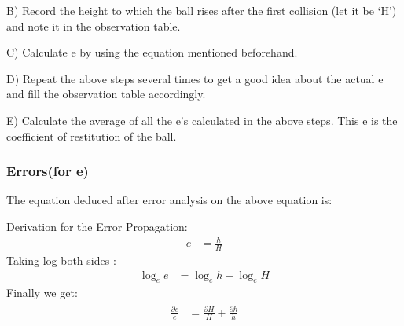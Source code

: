 \documentclass[11pt]{scrartcl} %
\begin{document}
B) Record the height to which the ball rises after the first collision (let it be ‘H’) and note it in the observation table. \par

C) Calculate e by using the equation mentioned beforehand. \par

D) Repeat the above steps several times to get a good idea about the actual e and fill the observation table accordingly. \par

E) Calculate the average of all the e’s calculated in the above steps. This e is the coefficient of restitution of the ball. \par

\subsubsection{Errors(for e)}
The equation deduced after error analysis on the above equation is:\par
Derivation for the Error Propagation:
\begin{align} 
		e &= \frac{h}{H} \nonumber
\end{align}
Taking log both sides :
\begin{align}
\log_e e &= \log_e h - \log_e H \nonumber
\end{align}
   Finally we get:
\begin{align} 
	\begin{split}
		\frac{\partial{e}}{e} &= \frac{\partial{H}}{H} + \frac{\partial{h}}{h}\\
	\end{split}					
\end{align}
\end{document}
